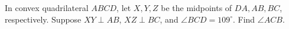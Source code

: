 In convex quadrilateral $ABCD$, let $X,Y,Z$ be the midpoints of $DA,AB,BC$, respectively. Suppose $XY\perp AB$, $XZ\perp BC$, and $\angle BCD=109^\circ$. Find $\angle ACB$.
